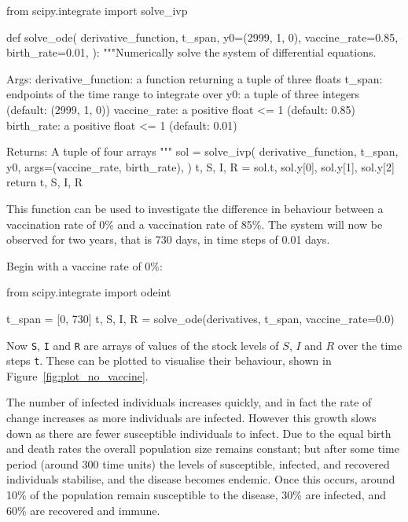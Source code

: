\begin{pyin}
from scipy.integrate import solve_ivp


def solve_ode(
    derivative_function,
    t_span,
    y0=(2999, 1, 0),
    vaccine_rate=0.85,
    birth_rate=0.01,
):
    """Numerically solve the system of differential equations.

    Args:
        derivative_function: a function returning a tuple
                             of three floats
        t_span: endpoints of the time range to integrate over
        y0: a tuple of three integers (default: (2999, 1, 0))
        vaccine_rate: a positive float <= 1 (default: 0.85)
        birth_rate: a positive float <= 1 (default: 0.01)

    Returns:
        A tuple of four arrays
    """
    sol = solve_ivp(
        derivative_function,
        t_span,
        y0,
        args=(vaccine_rate, birth_rate),
    )
    t, S, I, R = sol.t, sol.y[0], sol.y[1], sol.y[2]
    return t, S, I, R
\end{pyin}

This function can be used to investigate the difference in behaviour between a
vaccination rate of 0\% and a vaccination rate of 85\%. The system will now be
observed for two years, that is 730 days, in time steps of 0.01 days.

Begin with a vaccine rate of 0\%:

\begin{pyin}
from scipy.integrate import odeint

t_span = [0, 730]
t, S, I, R = solve_ode(derivatives, t_span, vaccine_rate=0.0)
\end{pyin}

Now \texttt{S}, \texttt{I} and \texttt{R}
are arrays of values of the stock levels of $S$, $I$ and $R$ over the time
steps \texttt{t}.
These can be plotted to visualise their behaviour, shown in
Figure~\ref{fig:plot_no_vaccine}.

The number of infected individuals increases quickly, and in fact the rate of
change increases as more individuals are infected. However this growth slows
down as there are fewer susceptible individuals to infect. Due to the equal
birth and death rates the overall population size remains constant; but after
some time period (around 300 time units) the levels of susceptible, infected,
and recovered individuals stabilise, and the disease becomes endemic. Once this
occurs, around 10\% of the population remain susceptible to the disease, 30\%
are infected, and 60\% are recovered and immune.

